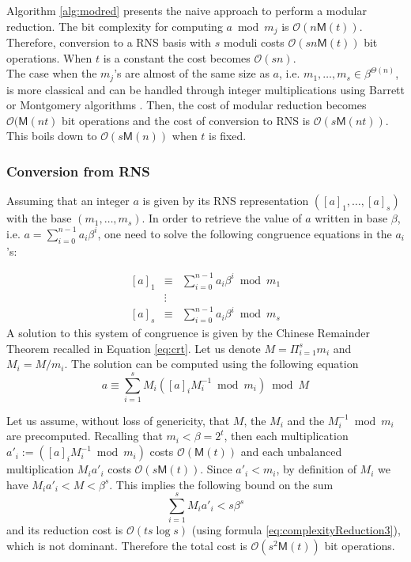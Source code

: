\documentclass[acmtoms,acmnow]{acmtrans2m}
\def\M{\mathsf{M}} \def\I{\mathsf{I}} \def\R{\mathsf{R}} \def\Q{\mathbb{Q}}
\def\bigO{{\ensuremath{\mathcal{O}}}}
\newcommand{\assign}{:=}
\begin{document}
\smallskip
Algorithm \ref{alg:modred} presents the naive approach to perform a modular reduction.
The bit complexity for computing $a \bmod m_j$ is $\bigO(n \M(t))$.
Therefore, conversion to a RNS basis with $s$ moduli costs $\bigO(sn\M(t))$ bit operations.
When $t$ is a constant the cost becomes $\bigO(sn)$.\\ 


The case when the $m_j$'s are almost of the same size as $a$,
i.e. $m_1,\dots,m_s \in \beta^{\Theta(n)}$, is more classical and can be handled
through integer multiplications using Barrett or Montgomery algorithms
\cite{Barrett86,Montgomery85}. Then, the cost of modular reduction becomes
$\bigO(\M(nt)$ bit operations and the cost of conversion to RNS is
$\bigO(s\M(nt))$.  This boils down to $\bigO(s\M(n))$ when $t$ is
fixed.

\subsubsection{Conversion from RNS}

Assuming that an integer $a$ is given by its RNS representation
$([a]_1, \dots, [a]_s)$ with the base $(m_1,\dots,m_s)$. In order to retrieve
the value of $a$ written in base $\beta$, i.e. $a=\sum_{i=0}^{n-1}a_i\beta^i$,
one need to solve the following congruence equations in the $a_i$'s:

\begin{eqnarray}
 \left[a\right]_1 &\equiv& \sum_{i=0}^{n-1}a_i\beta^i \bmod m_1\nonumber \\ 
 & \vdots & \\ 
 \left[a\right]_s & \equiv & \sum_{i=0}^{n-1}a_i\beta^i \bmod m_s \nonumber
\end{eqnarray}
A solution to this system of congruence is given by the Chinese Remainder
Theorem recalled in Equation \ref{eq:crt}.  Let us denote $M=\Pi_{i=1}^sm_i$ and
$M_i=M/m_i$. The solution can be computed using the following
equation
\begin{equation}\label{eq:cra}
a \equiv \sum_{i=1}^s M_i ([a]_iM_i^{-1} \bmod m_i) \bmod M 
\end{equation}

Let us assume, without loss of genericity, that $M$, the $M_i$ and the $M_i^{-1} \bmod m_i$ are precomputed.  
Recalling that $m_i <\beta=2^t$, then each multiplication $a'_i \assign ([a]_i M_i^{-1} \bmod m_i)$ costs
$\bigO(\M(t))$ and each unbalanced multiplication $M_i a'_i$ costs
$\bigO(s \M(t))$.
Since $a'_i < m_i$, by definition of $M_i$ we have $M_ia'_i<M<\beta^s$.
This implies the following bound on the sum 
\[
\sum_{i=1}^s M_i a'_i < s\beta^s
\]
and its reduction cost is $\bigO(t s \log s)$ (using formula
\eqref{eq:complexityReduction3}), which is not dominant. Therefore the total
cost is $\bigO(s^2\M(t))$ bit operations.\\
\end{document}
